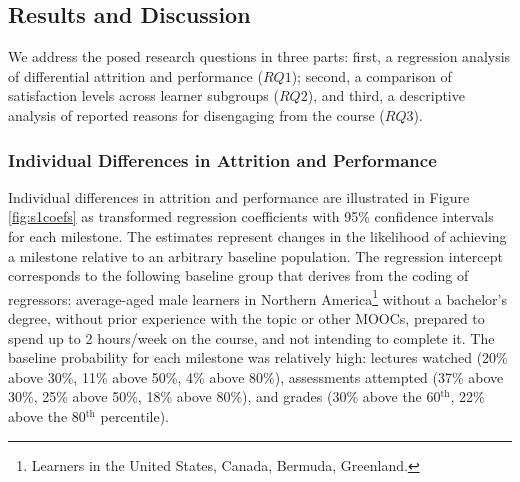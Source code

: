 \documentclass{sigchi}\usepackage[]{graphicx}\usepackage[]{color}
\begin{document}
\subsection{Results and Discussion}

We address the posed research questions in three parts: first, a regression analysis of differential attrition and performance ($RQ1$); second, a comparison of satisfaction levels across learner subgroups ($RQ2$), and third, a descriptive analysis of reported reasons for disengaging from the course ($RQ3$).

\subsubsection{Individual Differences in Attrition and Performance}

Individual differences in attrition and performance are illustrated in Figure \ref{fig:s1coefs} as transformed regression coefficients with 95\% confidence intervals for each milestone. The estimates represent changes in the likelihood of achieving a milestone relative to an arbitrary baseline population. The regression intercept corresponds to the following baseline group that derives from the coding of regressors: average-aged male learners in Northern America\footnote{Learners in the United States, Canada, Bermuda, Greenland.} without a bachelor's degree, without prior experience with the topic or other MOOCs, prepared to spend up to 2 hours/week on the course, and not intending to complete it. The baseline probability for each milestone was relatively high: lectures watched (20\% above 30\%, 11\% above 50\%, 4\% above 80\%), assessments attempted (37\% above 30\%, 25\% above 50\%, 18\% above 80\%), and grades (30\% above the 60$^\text{th}$, 22\% above the 80$^\text{th}$ percentile).
\end{document}

